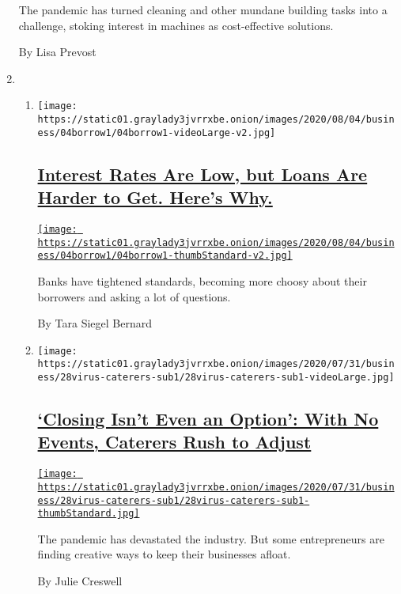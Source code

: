 \begin{enumerate}
  The pandemic has turned cleaning and other mundane building tasks into
  a challenge, stoking interest in machines as cost-effective solutions.

  By Lisa Prevost
\item
  \begin{enumerate}
  \def\labelenumii{\arabic{enumii}.}
  \item
    \texttt{[image: https://static01.graylady3jvrrxbe.onion/images/2020/08/04/business/04borrow1/04borrow1-videoLarge-v2.jpg]}

    \hypertarget{interest-rates-are-low-but-loans-are-harder-to-get-heres-why}{%
    \subsection{\texorpdfstring{\href{/2020/08/04/your-money/mortgage-loans-credit-cards-coronavirus.html}{Interest
    Rates Are Low, but Loans Are Harder to Get. Here's
    Why.}}{Interest Rates Are Low, but Loans Are Harder to Get. Here's Why.}}\label{interest-rates-are-low-but-loans-are-harder-to-get-heres-why}}

    \href{/2020/08/04/your-money/mortgage-loans-credit-cards-coronavirus.html}{\texttt{[image: https://static01.graylady3jvrrxbe.onion/images/2020/08/04/business/04borrow1/04borrow1-thumbStandard-v2.jpg]}}

    Banks have tightened standards, becoming more choosy about their
    borrowers and asking a lot of questions.

    By Tara Siegel Bernard
  \item
    \texttt{[image: https://static01.graylady3jvrrxbe.onion/images/2020/07/31/business/28virus-caterers-sub1/28virus-caterers-sub1-videoLarge.jpg]}

    \hypertarget{closing-isnt-even-an-option-with-no-events-caterers-rush-to-adjust}{%
    \subsection{\texorpdfstring{\href{/2020/08/04/business/coronavirus-struggling-caterers.html}{`Closing
    Isn't Even an Option': With No Events, Caterers Rush to
    Adjust}}{`Closing Isn't Even an Option': With No Events, Caterers Rush to Adjust}}\label{closing-isnt-even-an-option-with-no-events-caterers-rush-to-adjust}}

    \href{/2020/08/04/business/coronavirus-struggling-caterers.html}{\texttt{[image: https://static01.graylady3jvrrxbe.onion/images/2020/07/31/business/28virus-caterers-sub1/28virus-caterers-sub1-thumbStandard.jpg]}}

    The pandemic has devastated the industry. But some entrepreneurs are
    finding creative ways to keep their businesses afloat.

    By Julie Creswell
  \end{enumerate}
\end{enumerate}

